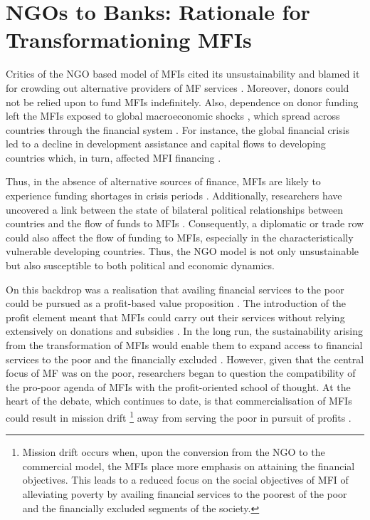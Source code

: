 \documentclass[a4paper, nobind]{templates/ociamthesis}
\begin{document}
\hypertarget{ngos-to-banks-rationale-for-transformationing-mfis}{%
\section{NGOs to Banks: Rationale for Transformationing MFIs}\label{ngos-to-banks-rationale-for-transformationing-mfis}}

\noindent Critics of the NGO based model of MFIs cited its unsustainability and blamed it for crowding out alternative providers of MF services \autocite{kota2007microfinance}. Moreover, donors could not be relied upon to fund MFIs indefinitely. Also, dependence on donor funding left the MFIs exposed to global macroeconomic shocks \autocite{d2017ngos}, which spread across countries through the financial system \autocite{schnabl2012international}. For instance, the global financial crisis led to a decline in development assistance and capital flows to developing countries which, in turn, affected MFI financing \autocite{leach2012global,wagner2013vulnerability}.

Thus, in the absence of alternative sources of finance, MFIs are likely to experience funding shortages in crisis periods \autocite{constantinou2011financial}. Additionally, researchers have uncovered a link between the state of bilateral political relationships between countries and the flow of funds to MFIs \autocite{garmaise2013cheap}. Consequently, a diplomatic or trade row could also affect the flow of funding to MFIs, especially in the characteristically vulnerable developing countries. Thus, the NGO model is not only unsustainable but also susceptible to both political and economic dynamics.

On this backdrop was a realisation that availing financial services to the poor could be pursued as a profit-based value proposition \autocite{rhyne1999microfinance}. The introduction of the profit element meant that MFIs could carry out their services without relying extensively on donations and subsidies \autocite{duvendack2015mis}. In the long run, the sustainability arising from the transformation of MFIs would enable them to expand access to financial services to the poor and the financially excluded \autocite{brown2012microfinance,sarma2011ngo}. However, given that the central focus of MF was on the poor, researchers began to question the compatibility of the pro-poor agenda of MFIs with the profit-oriented school of thought. At the heart of the debate, which continues to date, is that commercialisation of MFIs could result in mission drift \footnote{Mission drift occurs when, upon the conversion from the NGO to the commercial model, the MFIs place more emphasis on attaining the financial objectives. This leads to a reduced focus on the social objectives of MFI of alleviating poverty by availing financial services to the poorest of the poor and the financially excluded segments of the society.} away from serving the poor in pursuit of profits \autocite{im2015profits,mia2017mission}.
\end{document}
